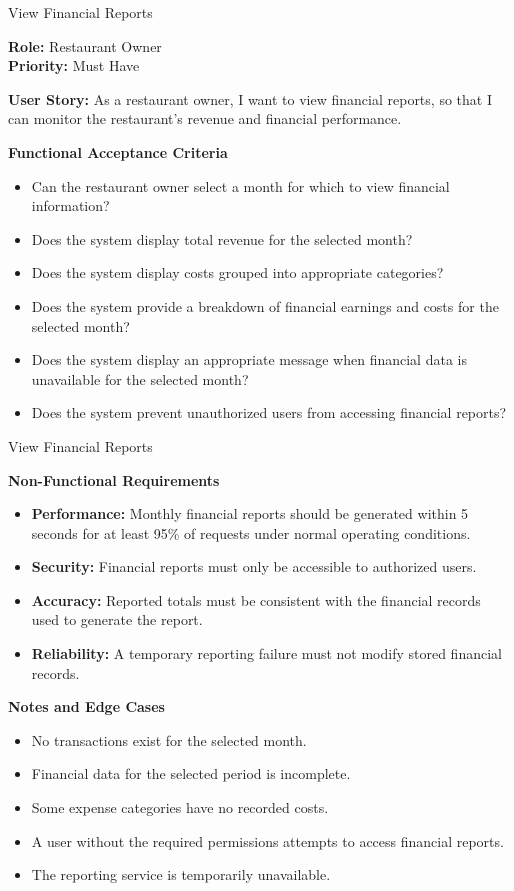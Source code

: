 
\begin{frame}{View Financial Reports}

\noindent\textbf{Role:} Restaurant Owner\\
\textbf{Priority:} Must Have

\textbf{User Story:} As a restaurant owner, I want to view financial reports, so that I can monitor the restaurant's revenue and financial performance.

\textbf{Functional Acceptance Criteria}
\begin{itemize}
  \item Can the restaurant owner select a month for which to view financial information?
  \item Does the system display total revenue for the selected month?
  \item Does the system display costs grouped into appropriate categories?
  \item Does the system provide a breakdown of financial earnings and costs for the selected month?
  \item Does the system display an appropriate message when financial data is unavailable for the selected month?
  \item Does the system prevent unauthorized users from accessing financial reports?
\end{itemize}

\end{frame}

\begin{frame}{View Financial Reports}

\textbf{Non-Functional Requirements}
\begin{itemize}
  \item \textbf{Performance:} Monthly financial reports should be generated within 5 seconds for at least 95\% of requests under normal operating conditions.
  \item \textbf{Security:} Financial reports must only be accessible to authorized users.
  \item \textbf{Accuracy:} Reported totals must be consistent with the financial records used to generate the report.
  \item \textbf{Reliability:} A temporary reporting failure must not modify stored financial records.
\end{itemize}

\textbf{Notes and Edge Cases}
\begin{itemize}
  \item No transactions exist for the selected month.
  \item Financial data for the selected period is incomplete.
  \item Some expense categories have no recorded costs.
  \item A user without the required permissions attempts to access financial reports.
  \item The reporting service is temporarily unavailable.
\end{itemize}

\end{frame}
